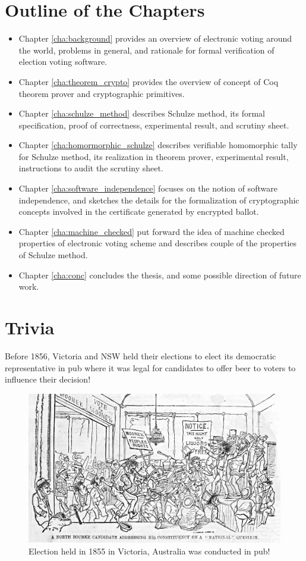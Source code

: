 \section{Outline of the Chapters}
\begin{itemize}

\item Chapter \ref{cha:background} provides an overview of electronic voting around the world, 
problems in general, and rationale for formal verification of election voting software. 
\item Chapter \ref{cha:theorem_crypto} provides the overview of concept of 
Coq theorem prover  and cryptographic primitives.  
\item Chapter \ref{cha:schulze_method} 
describes Schulze method, its formal specification, proof of correctness, experimental result, 
and scrutiny sheet.  
\item Chapter \ref{cha:homormorphic_schulze} describes 
verifiable homomorphic tally for Schulze method, its realization in theorem prover, experimental 
result,  instructions to audit the scrutiny sheet. 
\item Chapter \ref{cha:software_independence} focuses on the notion of software independence, and 
sketches the details for the formalization of  cryptographic concepts involved in the 
certificate generated by encrypted ballot. 
\item Chapter \ref{cha:machine_checked} put forward the idea of 
machine checked properties of electronic voting scheme and describes couple of the 
properties of Schulze method. 
\item Chapter \ref{cha:conc} concludes the thesis, and some possible direction of future work. 
\end{itemize}


\section{Trivia}
 Before 1856, Victoria and NSW held their elections to elect its 
	  democratic representative in pub where it was legal for 
	  candidates to offer beer to voters to influence their 
	  decision! 
	  
	   \begin{figure}[htb]
	\begin{center}
	\includegraphics[scale=0.25]{NorthBourke.jpg}
	\caption{Election held in 1855 in Victoria, Australia 
	  was conducted in pub!}
	\end{center}
  \end{figure}   
  
